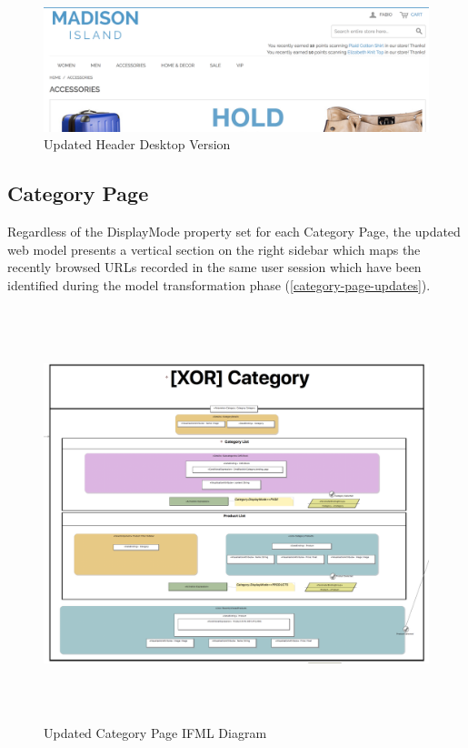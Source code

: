 \begin{figure}[H]
  \centering
    \includegraphics[width=14cm]{images/diagrams/after/desktop-header.png}
  \caption{Updated Header Desktop Version}
  \label{fig:desktop-after-header}
\end{figure}
\vspace{0.5cm}

\newpage
\subsection{Category Page}

Regardless of the DisplayMode property set for each Category Page, the updated web model presents a vertical section on the right sidebar which maps the recently browsed URLs recorded in the same user session which have been identified during the model transformation phase (\ref{category-page-updates}).

\vspace{0.5cm}
\begin{figure}[H]
  \centering
    \includegraphics[height=12cm]{images/diagrams/after/ifml-category.png}
  \caption{Updated Category Page IFML Diagram}
  \label{fig:ifml-after-category}
\end{figure}

